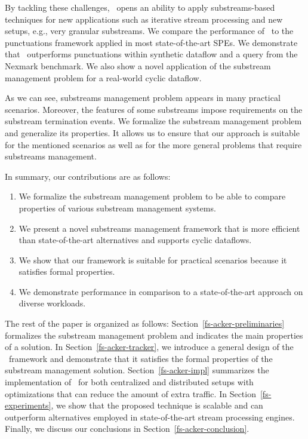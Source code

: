 By tackling these challenges, \tracker\ opens an ability to apply substreams-based techniques for new applications such as iterative stream processing and new setups, e.g., very granular substreams. We compare the performance of \tracker\ to the punctuations framework applied in most state-of-the-art SPEs. We demonstrate that \tracker\ outperforms punctuations within synthetic dataflow and a query from the Nexmark benchmark. We also show a novel application of the substream management problem for a real-world cyclic dataflow. 

As we can see, substreams management problem appears in many practical scenarios. Moreover, the features of some substreams impose requirements on the substream termination events. We formalize the substream management problem and generalize its properties. It allows us to ensure that our approach is suitable for the mentioned scenarios as well as for the more general problems that require substreams management.

In summary, our contributions are as follows:
\begin{enumerate}
    \item We formalize the substream management problem to be able to compare properties of various substream management systems.
    \item We present a novel substreams management framework that is more efficient than state-of-the-art alternatives and supports cyclic dataflows.
    \item We show that our framework is suitable for practical scenarios because it satisfies formal properties.
    \item We demonstrate \tracker performance in comparison to a state-of-the-art approach on diverse workloads.
\end{enumerate}

The rest of the paper is organized as follows: Section~\ref{fs-acker-preliminaries} formalizes the substream management problem and indicates the main properties of a solution. In Section~\ref{fs-acker-tracker}, we introduce a general design of the \tracker\ framework and demonstrate that it satisfies the formal properties of the substream management solution. Section~\ref{fs-acker-impl} summarizes the implementation of \tracker\ for both centralized and distributed setups with optimizations that can reduce the amount of extra traffic. In Section~\ref{fs-experiments}, we show that the proposed technique is scalable and can outperform alternatives employed in state-of-the-art stream processing engines. Finally, we discuss our conclusions in Section~\ref{fs-acker-conclusion}.
